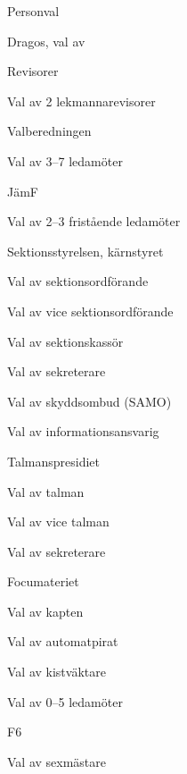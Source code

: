 \documentclass{sektionsmote}
\begin{document}
\begin{ootd}
\item{Personval}
\begin{ootd}
    \item Dragos, val av
    \item Revisorer
    \begin{ootd}
        \item Val av 2 lekmannarevisorer
    \end{ootd}
    \item Valberedningen
    \begin{ootd}
        \item Val av 3--7 ledamöter
    \end{ootd}
    \item JämF
    \begin{ootd}
	\item Val av 2--3 fristående ledamöter
    \end{ootd}
    \item Sektionsstyrelsen, kärnstyret
    \begin{ootd}
        \item Val av sektionsordförande
        \item Val av vice sektionsordförande
        \item Val av sektionskassör
        \item Val av sekreterare
        \item Val av skyddsombud (SAMO)
        \item Val av informationsansvarig
    \end{ootd}
    \item Talmanspresidiet
    \begin{ootd}
        \item Val av talman
        \item Val av vice talman
        \item Val av sekreterare
    \end{ootd}
    \item Focumateriet
    \begin{ootd}
        \item Val av kapten
        \item Val av automatpirat
        \item Val av kistväktare
        \item Val av 0--5 ledamöter
    \end{ootd}
    \item F6
    \begin{ootd}
        \item Val av sexmästare

\end{ootd}
\end{ootd}
\end{ootd}
\end{document}
